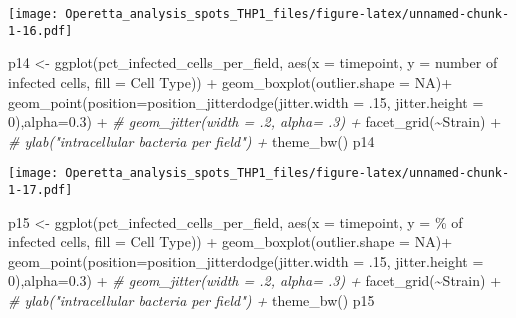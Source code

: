 \documentclass[
]{article}
\newenvironment{Shaded}{\begin{snugshade}}{\end{snugshade}}
\newcommand{\AttributeTok}[1]{\textcolor[rgb]{0.77,0.63,0.00}{#1}}
\newcommand{\CommentTok}[1]{\textcolor[rgb]{0.56,0.35,0.01}{\textit{#1}}}
\newcommand{\ConstantTok}[1]{\textcolor[rgb]{0.00,0.00,0.00}{#1}}
\newcommand{\DecValTok}[1]{\textcolor[rgb]{0.00,0.00,0.81}{#1}}
\newcommand{\FloatTok}[1]{\textcolor[rgb]{0.00,0.00,0.81}{#1}}
\newcommand{\FunctionTok}[1]{\textcolor[rgb]{0.00,0.00,0.00}{#1}}
\newcommand{\NormalTok}[1]{#1}
\newcommand{\OtherTok}[1]{\textcolor[rgb]{0.56,0.35,0.01}{#1}}
\newcommand{\SpecialCharTok}[1]{\textcolor[rgb]{0.00,0.00,0.00}{#1}}
\newcommand{\StringTok}[1]{\textcolor[rgb]{0.31,0.60,0.02}{#1}}
\begin{document}
\texttt{[image: Operetta\_analysis\_spots\_THP1\_files/figure-latex/unnamed-chunk-1-16.pdf]}

\begin{Shaded}
\begin{Highlighting}[]
\NormalTok{p14 }\OtherTok{\textless{}{-}} \FunctionTok{ggplot}\NormalTok{(pct\_infected\_cells\_per\_field, }\FunctionTok{aes}\NormalTok{(}\AttributeTok{x =}\NormalTok{ timepoint, }\AttributeTok{y =} \StringTok{\textasciigrave{}}\AttributeTok{number of infected cells}\StringTok{\textasciigrave{}}\NormalTok{, }\AttributeTok{fill =} \StringTok{\textasciigrave{}}\AttributeTok{Cell Type}\StringTok{\textasciigrave{}}\NormalTok{)) }\SpecialCharTok{+}
  \FunctionTok{geom\_boxplot}\NormalTok{(}\AttributeTok{outlier.shape =} \ConstantTok{NA}\NormalTok{)}\SpecialCharTok{+}
  \FunctionTok{geom\_point}\NormalTok{(}\AttributeTok{position=}\FunctionTok{position\_jitterdodge}\NormalTok{(}\AttributeTok{jitter.width =}\NormalTok{ .}\DecValTok{15}\NormalTok{, }\AttributeTok{jitter.height =} \DecValTok{0}\NormalTok{),}\AttributeTok{alpha=}\FloatTok{0.3}\NormalTok{) }\SpecialCharTok{+}
  \CommentTok{\#  geom\_jitter(width = .2, alpha= .3) +}
  \FunctionTok{facet\_grid}\NormalTok{(}\SpecialCharTok{\textasciitilde{}}\NormalTok{Strain) }\SpecialCharTok{+}
  \CommentTok{\#  ylab("intracellular bacteria per field") +}
  \FunctionTok{theme\_bw}\NormalTok{()}
\NormalTok{p14}
\end{Highlighting}
\end{Shaded}

\texttt{[image: Operetta\_analysis\_spots\_THP1\_files/figure-latex/unnamed-chunk-1-17.pdf]}

\begin{Shaded}
\begin{Highlighting}[]
\NormalTok{p15 }\OtherTok{\textless{}{-}} \FunctionTok{ggplot}\NormalTok{(pct\_infected\_cells\_per\_field, }\FunctionTok{aes}\NormalTok{(}\AttributeTok{x =}\NormalTok{ timepoint, }\AttributeTok{y =} \StringTok{\textasciigrave{}}\AttributeTok{\% of infected cells}\StringTok{\textasciigrave{}}\NormalTok{, }\AttributeTok{fill =} \StringTok{\textasciigrave{}}\AttributeTok{Cell Type}\StringTok{\textasciigrave{}}\NormalTok{)) }\SpecialCharTok{+}
  \FunctionTok{geom\_boxplot}\NormalTok{(}\AttributeTok{outlier.shape =} \ConstantTok{NA}\NormalTok{)}\SpecialCharTok{+}
  \FunctionTok{geom\_point}\NormalTok{(}\AttributeTok{position=}\FunctionTok{position\_jitterdodge}\NormalTok{(}\AttributeTok{jitter.width =}\NormalTok{ .}\DecValTok{15}\NormalTok{, }\AttributeTok{jitter.height =} \DecValTok{0}\NormalTok{),}\AttributeTok{alpha=}\FloatTok{0.3}\NormalTok{) }\SpecialCharTok{+}
  \CommentTok{\#  geom\_jitter(width = .2, alpha= .3) +}
  \FunctionTok{facet\_grid}\NormalTok{(}\SpecialCharTok{\textasciitilde{}}\NormalTok{Strain) }\SpecialCharTok{+}
\CommentTok{\#  ylab("intracellular bacteria per field") +}
  \FunctionTok{theme\_bw}\NormalTok{()}
\NormalTok{p15}
\end{Highlighting}
\end{Shaded}
\end{document}

